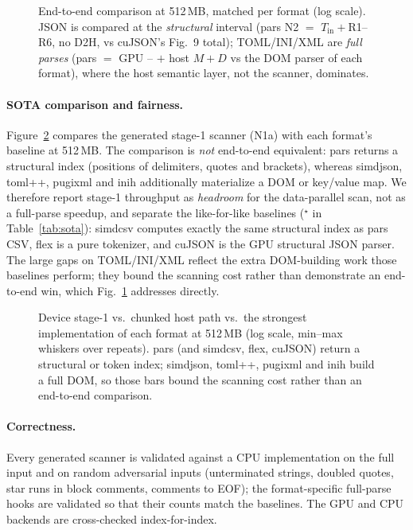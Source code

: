 \begin{figure}[t]
\centering
{}
\caption{End-to-end comparison at 512\,MB, matched per format (log scale).
JSON is compared at the \emph{structural} interval (pars N2 $=$
$T_{\mathrm{in}}+$R1--R6, no D2H, vs \textsf{cuJSON}'s Fig.~9 total); TOML/INI/XML
are \emph{full parses} (pars $=$ GPU \Rone--\Rsix{} $+$ host $M{+}D$ vs the DOM
parser of each format), where the host semantic layer, not the scanner,
dominates.}
\label{fig:parse}
\end{figure}

\paragraph{SOTA comparison and fairness.}
Figure~\ref{fig:sota} compares the generated stage-1 scanner (N1a) with each
format's baseline at 512\,MB.  The comparison is \emph{not} end-to-end
equivalent: pars returns a structural index (positions of delimiters, quotes and
brackets), whereas \textsf{simdjson}, \textsf{toml++}, \textsf{pugixml} and
\textsf{inih} additionally materialize a DOM or key/value map.  We therefore
report stage-1 throughput as \emph{headroom} for the data-parallel scan, not as
a full-parse speedup, and separate the like-for-like baselines
($^\star$ in Table~\ref{tab:sota}): \textsf{simdcsv} computes exactly the same
structural index as pars CSV, \textsf{flex} is a pure tokenizer, and
\textsf{cuJSON} is the GPU structural JSON parser.  The large gaps on
TOML/INI/XML reflect the extra DOM-building work those baselines perform; they
bound the scanning cost rather than demonstrate an end-to-end win, which
Fig.~\ref{fig:parse} addresses directly.

\begin{figure}[t]
\centering
{}
\caption{Device stage-1 vs.\ chunked host path vs.\ the strongest implementation
of each format at 512\,MB (log scale, min--max whiskers over repeats).  pars
(and \textsf{simdcsv}, \textsf{flex}, \textsf{cuJSON}) return a structural or
token index; \textsf{simdjson}, \textsf{toml++}, \textsf{pugixml} and
\textsf{inih} build a full DOM, so those bars bound the scanning cost rather
than an end-to-end comparison.}
\label{fig:sota}
\end{figure}

\paragraph{Correctness.}
Every generated scanner is validated against a CPU implementation on the full
input and on random adversarial inputs (unterminated strings, doubled quotes,
star runs in block comments, comments to EOF); the format-specific full-parse
hooks are validated so that their counts match the baselines.  The GPU and CPU
backends are cross-checked index-for-index.

